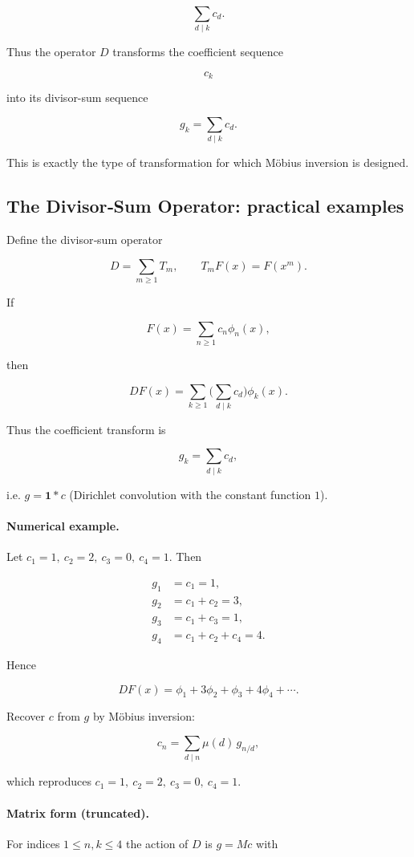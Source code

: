 \[
\boxed{
\sum_{d\mid k}c_d.
}
\]

Thus the operator \(D\) transforms the coefficient sequence

\[
c_k
\]

into its divisor-sum sequence

\[
\boxed{
g_k=\sum_{d\mid k}c_d.
}
\]

This is exactly the type of transformation for which Möbius inversion
is designed.

\subsection*{The Divisor‑Sum Operator: practical examples}

Define the divisor‑sum operator


\[
D=\sum_{m\ge1}T_m,\qquad T_mF(x)=F(x^m).
\]


If


\[
F(x)=\sum_{n\ge1}c_n\phi_n(x),
\]


then


\[
DF(x)=\sum_{k\ge1}\Big(\sum_{d\mid k}c_d\Big)\phi_k(x).
\]


Thus the coefficient transform is


\[
g_k=\sum_{d\mid k}c_d,
\]


i.e. \(g=\mathbf{1}*c\) (Dirichlet convolution with the constant function \(1\)).

\paragraph{Numerical example.}
Let \(c_1=1,\ c_2=2,\ c_3=0,\ c_4=1\). Then


\[
\begin{aligned}
g_1&=c_1=1,\\
g_2&=c_1+c_2=3,\\
g_3&=c_1+c_3=1,\\
g_4&=c_1+c_2+c_4=4.
\end{aligned}
\]


Hence


\[
DF(x)=\phi_1+3\phi_2+\phi_3+4\phi_4+\cdots.
\]


Recover \(c\) from \(g\) by Möbius inversion:


\[
c_n=\sum_{d\mid n}\mu(d)\,g_{n/d},
\]


which reproduces \(c_1=1,\ c_2=2,\ c_3=0,\ c_4=1\).

\paragraph{Matrix form (truncated).}
For indices \(1\le n,k\le4\) the action of \(D\) is \(g=Mc\) with


